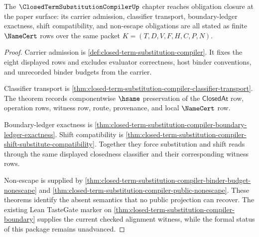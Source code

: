\begin{theorem}
\label{thm:closed-term-substitution-compiler-obligation-closure-package}
The $\ClosedTermSubstitutionCompilerUp$ chapter reaches obligation closure at the paper surface: its carrier admission, classifier transport, boundary-ledger exactness, shift compatibility, and non-escape obligations are all stated as finite $\NameCert$ rows over the same packet $K=(T,D,V,F,H,C,P,N)$.
\end{theorem}
\begin{proof}
Carrier admission is \autoref{def:closed-term-substitution-compiler}. It fixes the eight displayed rows and excludes evaluator correctness, host binder conventions, and unrecorded binder budgets from the carrier.

Classifier transport is \autoref{thm:closed-term-substitution-compiler-classifier-transport}. The theorem records componentwise $\hsame$ preservation of the $\mathsf{ClosedAt}$ row, operation rows, witness row, route, provenance, and local $\NameCert$ row.

Boundary-ledger exactness is \autoref{thm:closed-term-substitution-compiler-boundary-ledger-exactness}. Shift compatibility is \autoref{thm:closed-term-substitution-compiler-shift-substitute-compatibility}. Together they force substitution and shift reads through the same displayed closedness classifier and their corresponding witness rows.

Non-escape is supplied by \autoref{thm:closed-term-substitution-compiler-binder-budget-nonescape} and \autoref{thm:closed-term-substitution-compiler-public-nonescape}. These theorems identify the absent semantics that no public projection can recover. The existing Lean TasteGate marker on \autoref{thm:closed-term-substitution-compiler-boundary} supplies the current checked alignment witness, while the formal status of this package remains unadvanced.
\end{proof}

